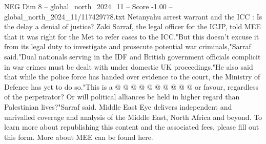 \begin{textsample}{NEG Dim 8 – global\_north\_2024\_11 – Score -1.00 – global\_north\_2024\_11/117429778.txt}
Netanyahu arrest warrant and the ICC : Is the delay a denial of justice?
Zaki Sarraf, the legal officer for the ICJP, told MEE that it was right for the Met to refer cases to the ICC."But this doesn't excuse it from its legal duty to investigate and prosecute potential war criminals,"Sarraf said."Dual nationals serving in the IDF and British government officials complicit in war crimes must be dealt with under domestic UK proceedings."He also said that while the police force has handed over evidence to the court, the Ministry of Defence has yet to do so."This is a @ @ @ @ @ @ @ @ @ @ or favour, regardless of the perpetrator?
Or will political alliances be held in higher regard than Palestinian lives?"Sarraf said.
Middle East Eye delivers independent and unrivalled coverage and analysis of the Middle East, North Africa and beyond.
To learn more about republishing this content and the associated fees, please fill out this form.
More about MEE can be found here.

\end{textsample}

